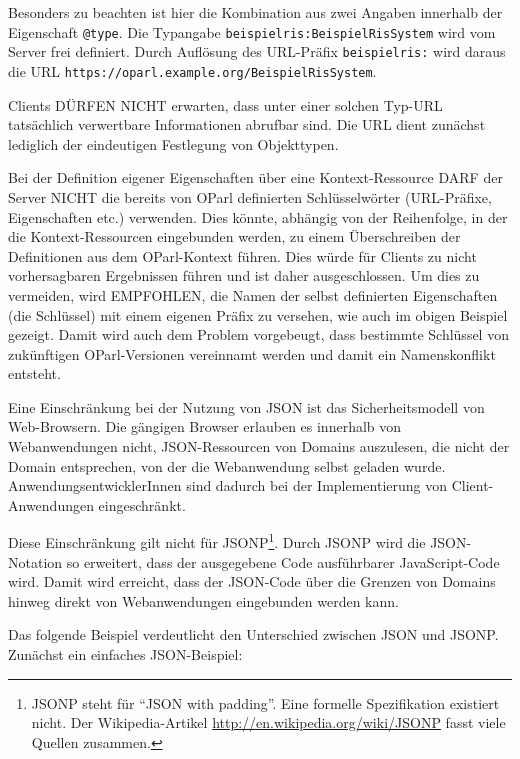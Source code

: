 \documentclass[,a4paper]{article}
\begin{document}
Besonders zu beachten ist hier die Kombination aus zwei Angaben
innerhalb der Eigenschaft \texttt{@type}. Die Typangabe
\texttt{beispielris:BeispielRisSystem} wird vom Server frei definiert.
Durch Auflösung des URL-Präfix \texttt{beispielris:} wird daraus die URL
\texttt{https://oparl.example.org/BeispielRisSystem}.

Clients DÜRFEN NICHT erwarten, dass unter einer solchen Typ-URL
tatsächlich verwertbare Informationen abrufbar sind. Die URL dient
zunächst lediglich der eindeutigen Festlegung von Objekttypen.

Bei der Definition eigener Eigenschaften über eine Kontext-Ressource
DARF der Server NICHT die bereits von OParl definierten Schlüsselwörter
(URL-Präfixe, Eigenschaften etc.) verwenden. Dies könnte, abhängig von
der Reihenfolge, in der die Kontext-Ressourcen eingebunden werden, zu
einem Überschreiben der Definitionen aus dem OParl-Kontext führen. Dies
würde für Clients zu nicht vorhersagbaren Ergebnissen führen und ist
daher ausgeschlossen. Um dies zu vermeiden, wird EMPFOHLEN, die Namen
der selbst definierten Eigenschaften (die Schlüssel) mit einem eigenen
Präfix zu versehen, wie auch im obigen Beispiel gezeigt. Damit wird auch
dem Problem vorgebeugt, dass bestimmte Schlüssel von zukünftigen
OParl-Versionen vereinnamt werden und damit ein Namenskonflikt entsteht.


Eine Einschränkung bei der Nutzung von JSON ist das Sicherheitsmodell
von Web-Browsern. Die gängigen Browser erlauben es innerhalb von
Webanwendungen nicht, JSON-Ressourcen von Domains auszulesen, die nicht
der Domain entsprechen, von der die Webanwendung selbst geladen wurde.
AnwendungsentwicklerInnen sind dadurch bei der Implementierung von
Client-Anwendungen eingeschränkt.

Diese Einschränkung gilt nicht für JSONP\footnote{JSONP steht für ``JSON
  with padding''. Eine formelle Spezifikation existiert nicht. Der
  Wikipedia-Artikel \url{http://en.wikipedia.org/wiki/JSONP} fasst viele
  Quellen zusammen.}. Durch JSONP wird die JSON-Notation so erweitert,
dass der ausgegebene Code ausführbarer JavaScript-Code wird. Damit wird
erreicht, dass der JSON-Code über die Grenzen von Domains hinweg direkt
von Webanwendungen eingebunden werden kann.

Das folgende Beispiel verdeutlicht den Unterschied zwischen JSON und
JSONP. Zunächst ein einfaches JSON-Beispiel:
\end{document}
